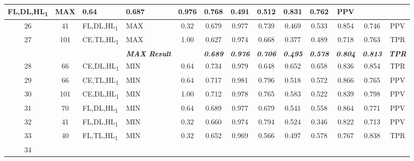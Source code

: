 \begin{table}[H]
{\begin{tabular}{ccl|l|c|c|c|c|c|c|c|c|c|}
    FL,DL,HL\textsubscript{1} &
    MAX &
    0.64 &
    0.687 &
    0.976 &
    0.768 &
    0.491 &
    0.512 &
    0.831 &
    0.762 &
    PPV \\ \hline
  \multicolumn{1}{|c|}{26} &
    \multicolumn{1}{c|}{41} &
    FL,DL,HL\textsubscript{1} &
    MAX &
    0.32 &
    0.679 &
    0.977 &
    0.739 &
    0.469 &
    0.533 &
    0.854 &
    0.746 &
    PPV \\ \hline
  \multicolumn{1}{|c|}{27} &
    \multicolumn{1}{c|}{101} &
    CE,TL,HL\textsubscript{1} &
    MAX &
    1.00 &
    0.627 &
    0.974 &
    0.668 &
    0.377 &
    0.489 &
    0.718 &
    0.763 &
    TPR \\ \hline
   &
    \textit{\textbf{}} &
     &
    \textit{\textbf{MAX Result}} &
     &
    \textit{\textbf{0.689}} &
    \textit{\textbf{0.976}} &
    \textit{\textbf{0.706}} &
    \textit{\textbf{0.495}} &
    \textit{\textbf{0.578}} &
    \textit{\textbf{0.804}} &
    \textit{\textbf{0.813}} &
    \textit{\textbf{TPR}} \\ \hline
  \multicolumn{1}{|c|}{28} &
    \multicolumn{1}{c|}{66} &
    CE,DL,HL\textsubscript{1} &
    MIN &
    0.64 &
    0.734 &
    0.979 &
    0.648 &
    0.652 &
    0.658 &
    0.836 &
    0.854 &
    TPR \\ \hline
  \multicolumn{1}{|c|}{29} &
    \multicolumn{1}{c|}{66} &
    CE,TL,HL\textsubscript{1} &
    MIN &
    0.64 &
    0.717 &
    0.981 &
    0.796 &
    0.518 &
    0.572 &
    0.866 &
    0.765 &
    PPV \\ \hline
  \multicolumn{1}{|c|}{30} &
    \multicolumn{1}{c|}{101} &
    CE,DL,HL\textsubscript{1} &
    MIN &
    1.00 &
    0.712 &
    0.978 &
    0.765 &
    0.583 &
    0.522 &
    0.839 &
    0.798 &
    PPV \\ \hline
  \multicolumn{1}{|c|}{31} &
    \multicolumn{1}{c|}{70} &
    FL,DL,HL\textsubscript{1} &
    MIN &
    0.64 &
    0.689 &
    0.977 &
    0.679 &
    0.541 &
    0.558 &
    0.864 &
    0.771 &
    PPV \\ \hline
  \multicolumn{1}{|c|}{32} &
    \multicolumn{1}{c|}{41} &
    FL,DL,HL\textsubscript{1} &
    MIN &
    0.32 &
    0.660 &
    0.974 &
    0.794 &
    0.524 &
    0.346 &
    0.822 &
    0.713 &
    PPV \\ \hline
  \multicolumn{1}{|c|}{33} &
    \multicolumn{1}{c|}{40} &
    FL,TL,HL\textsubscript{1} &
    MIN &
    0.32 &
    0.652 &
    0.969 &
    0.566 &
    0.497 &
    0.578 &
    0.767 &
    0.838 &
    TPR \\ \hline
  \multicolumn{1}{|c|}{34} &

\end{tabular}}
\end{table}
